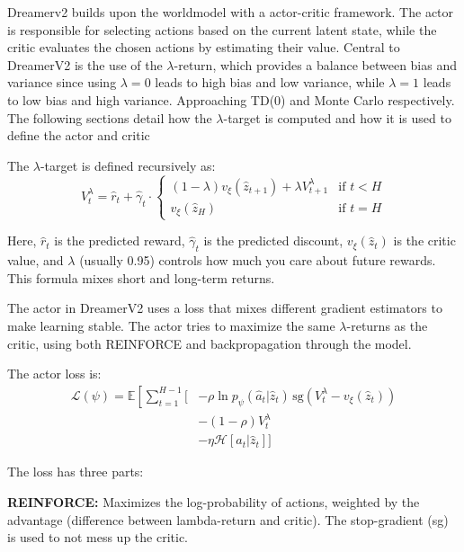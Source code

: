 \documentclass[
	english,
	ruledheaders=section,
	class=report,
	thesis={type=master},
	accentcolor=9c,
	custommargins=true,
	marginpar=false,
	parskip=half-,
	fontsize=11pt,
]{tudapub}
\begin{document}
Dreamerv2 builds upon the worldmodel with a actor-critic framework. The actor
is responsible for selecting actions based on the current latent state, while
the critic evaluates the chosen actions by estimating their value. Central to DreamerV2 is the
use of the $\lambda$-return, which provides a balance between bias and variance
since using $\lambda=0$ leads to high bias and low variance, while $\lambda=1$ leads to low bias and high variance. Approaching
TD(0) and Monte Carlo respectively. The following sections detail how the
$\lambda$-target is computed and how it is used to define the actor and critic

The $\lambda$-target is defined recursively as:
\begin{equation}
	V^{\lambda}_t = \hat{r}_t + \hat{\gamma}_t \cdot \begin{cases}
		(1 - \lambda)v_\xi(\hat{z}_{t+1}) + \lambda V^{\lambda}_{t+1} & \text{if } t < H \\
		v_\xi(\hat{z}_H)                                              & \text{if } t = H
	\end{cases}
\end{equation}

Here, $\hat{r}_t$ is the predicted reward, $\hat{\gamma}_t$ is the predicted
discount, $v_\xi(\hat{z}_t)$ is the critic value, and $\lambda$ (usually 0.95)
controls how much you care about future rewards. This formula mixes short and
long-term returns.

The actor in DreamerV2 uses a loss that mixes different gradient estimators to
make learning stable. The actor tries to maximize the same $\lambda$-returns as
the critic, using both REINFORCE and backpropagation through the model.

The actor loss is:
\begin{align}
	\mathcal{L}(\psi) = \mathbb{E}\left[\sum_{t=1}^{H-1} \Big[\right. & -\rho \ln p_\psi(\hat{a}_t | \hat{z}_t) \, \text{sg}(V^{\lambda}_t - v_\xi(\hat{z}_t)) \\
	                                                                  & -(1-\rho)V^{\lambda}_t                                                                 \\
	                                                                  & -\eta \mathcal{H}[a_t|\hat{z}_t] \Big]
\end{align}

The loss has three parts:

\textbf{REINFORCE:} Maximizes the log-probability of actions, weighted by the advantage (difference between lambda-return and critic). The stop-gradient (sg) is used to not mess up the critic.
\end{document}
